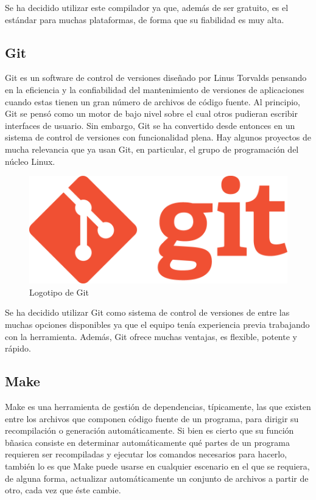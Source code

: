 		Se ha decidido utilizar este compilador ya que, además de ser gratuito, es el estándar para muchas plataformas, de forma que su fiabilidad es muy alta.

	\subsection{Git}

		Git es un software de control de versiones diseñado por Linus Torvalds pensando en la eficiencia y la confiabilidad del mantenimiento de versiones de aplicaciones cuando estas tienen un gran número de archivos de código fuente. Al principio, Git se pensó como un motor de bajo nivel sobre el cual otros pudieran escribir interfaces de usuario. Sin embargo, Git se ha convertido desde entonces en un sistema de control de versiones con funcionalidad plena. Hay algunos proyectos de mucha relevancia que ya usan Git, en particular, el grupo de programación del núcleo Linux.

		\begin{figure}[!htp]
			 \centering
			 \includegraphics{fig/git}
			 \caption{Logotipo de Git}
			 \label{fig:git}
		\end{figure}

		Se ha decidido utilizar Git como sistema de control de versiones de entre las muchas opciones disponibles ya que el equipo tenía experiencia previa trabajando con la herramienta. Además, Git ofrece muchas ventajas, es flexible, potente y rápido.

	\subsection{Make}

		Make es una herramienta de gestión de dependencias, típicamente, las que existen entre los archivos que componen código fuente de un programa, para dirigir su recompilación o generación automáticamente. Si bien es cierto que su función bñasica consiste en determinar automáticamente qué partes de un programa requieren ser recompiladas y ejecutar los comandos necesarios para hacerlo, también lo es que Make puede usarse en cualquier escenario en el que se requiera, de alguna forma, actualizar automáticamente un conjunto de archivos a partir de otro, cada vez que éste cambie.


